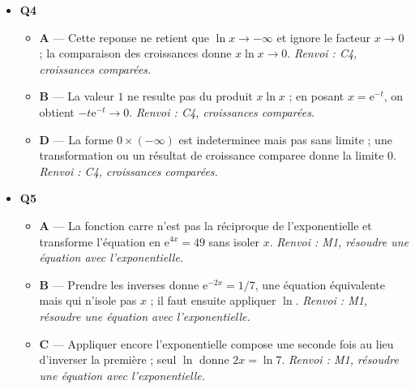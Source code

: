\begin{itemize}
  \item \textbf{Q4}
  \begin{itemize}
    \item \textbf{A} — Cette reponse ne retient que $\ln x\to-\infty$ et ignore le facteur $x\to0$ ; la comparaison des croissances donne $x\ln x\to0$. \emph{Renvoi : C4, croissances comparées.}
    \item \textbf{B} — La valeur $1$ ne resulte pas du produit $x\ln x$ ; en posant $x=\mathrm e^{-t}$, on obtient $-t\mathrm e^{-t}\to0$. \emph{Renvoi : C4, croissances comparées.}
    \item \textbf{D} — La forme $0\times(-\infty)$ est indeterminee mais pas sans limite ; une transformation ou un résultat de croissance comparee donne la limite $0$. \emph{Renvoi : C4, croissances comparées.}
  \end{itemize}
  \item \textbf{Q5}
  \begin{itemize}
    \item \textbf{A} — La fonction carre n'est pas la réciproque de l'exponentielle et transforme l'équation en $\mathrm e^{4x}=49$ sans isoler $x$. \emph{Renvoi : M1, résoudre une équation avec l'exponentielle.}
    \item \textbf{B} — Prendre les inverses donne $\mathrm e^{-2x}=1/7$, une équation équivalente mais qui n'isole pas $x$ ; il faut ensuite appliquer $\ln$. \emph{Renvoi : M1, résoudre une équation avec l'exponentielle.}
    \item \textbf{C} — Appliquer encore l'exponentielle compose une seconde fois au lieu d'inverser la première ; seul $\ln$ donne $2x=\ln 7$. \emph{Renvoi : M1, résoudre une équation avec l'exponentielle.}
  \end{itemize}
\end{itemize}
\fi
